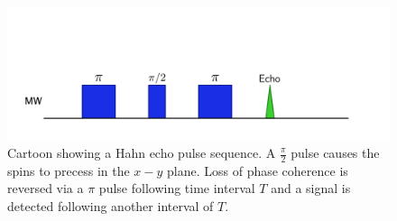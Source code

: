 \begin{figure}
\centering
\includegraphics[width = \columnwidth]{Figures/hahnEcho.pdf}
\caption[Hahn echo sequence]{Cartoon showing a Hahn echo pulse sequence. A $\frac{\pi}{2}$ pulse causes the spins to precess in the $x-y$ plane. Loss of phase coherence is reversed via a $\pi$ pulse following time interval $T$ and a signal is detected following another interval of $T$.}
\label{fig:HahnEcho}
\end{figure}